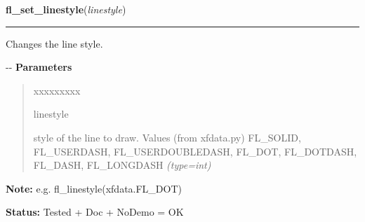 \hspace{.8\funcindent}\begin{boxedminipage}{\funcwidth}

    \raggedright \textbf{fl\_set\_linestyle}(\textit{linestyle})

    \vspace{-1.5ex}

    \rule{\textwidth}{0.5\fboxrule}
\setlength{\parskip}{2ex}

Changes the line style.

-{}-
\setlength{\parskip}{1ex}
      \textbf{Parameters}
      \vspace{-1ex}

      \begin{quote}
        \begin{Ventry}{xxxxxxxxx}

          \item[linestyle]


style of the line to draw. Values (from xfdata.py) FL\_SOLID,
FL\_USERDASH, FL\_USERDOUBLEDASH, FL\_DOT, FL\_DOTDASH, FL\_DASH,
FL\_LONGDASH
            {\it (type=int)}

        \end{Ventry}

      \end{quote}

\textbf{Note:} 
e.g. fl\_linestyle(xfdata.FL\_DOT)


\textbf{Status:} 
Tested + Doc + NoDemo = OK


    \end{boxedminipage}

    \label{xformslib:flxbasic:fl_drawmode}

    \vspace{0.5ex}

